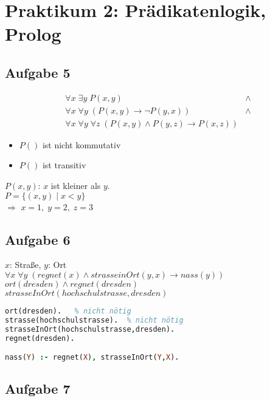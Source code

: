 \documentclass{scrreprt}
\begin{document}
\chapter{Praktikum 2: Prädikatenlogik, Prolog}
\section{Aufgabe 5}
\begin{align*}
&\forall x \;\exists y \;P(x,y) &\wedge&\\
&\forall x \; \forall y \; (P(x,y) \to \neg P(y,x)) &\wedge&\\
&\forall x \; \forall y \; \forall z \; (P(x,y) \wedge P(y,z) \to P(x,z))&&
\end{align*}
\begin{itemize}
\item $P()$ ist nicht kommutativ
\item $P()$ ist transitiv
\end{itemize}
$P(x,y)$: $x$ ist kleiner als $y$.\\
$P=\{(x,y) \;|\; x< y\}$\\
$\Rightarrow$ $x=1,\; y=2,\; z=3$

\section{Aufgabe 6}
$x$: Straße, $y$: Ort\\
$\forall x \; \forall y \; ( regnet(x) \wedge strasseinOrt(y,x) \to nass(y) )$\bigskip\\
$ort(dresden) \wedge regnet(dresden) $\\
$strasseInOrt(hochschulstrasse,dresden)$

\begin{lstlisting}[language=Prolog]
ort(dresden).	% nicht nötig
strasse(hochschulstrasse).	% nicht nötig
strasseInOrt(hochschulstrasse,dresden).
regnet(dresden).

nass(Y) :- regnet(X), strasseInOrt(Y,X).
\end{lstlisting}

\section{Aufgabe 7}

\end{document}
